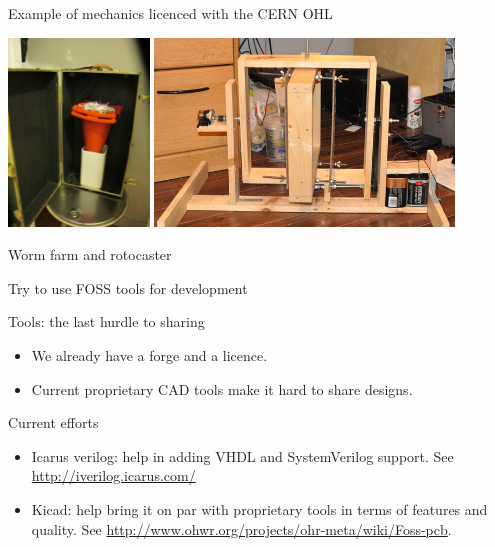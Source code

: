 \documentclass[compress,red]{beamer}
\begin{document}
\begin{frame}{Example of mechanics licenced with the CERN OHL}
 \begin{center}
   \includegraphics[height=5cm]{worm-farm-008.jpg}
   \includegraphics[height=5cm]{rotocaster.jpg}

Worm farm and rotocaster
 \end{center} 
\end{frame}

\begin{frame}{Try to use FOSS tools for development}

\begin{block}{Tools: the last hurdle to sharing}
\begin{itemize}
 \item We already have a forge and a licence.
 \item Current proprietary CAD tools make it hard to share designs.
\end{itemize}
\end{block}

\begin{block}{Current efforts}
\begin{itemize}
 \item Icarus verilog: help in adding VHDL and SystemVerilog support.
 See \href{http://iverilog.icarus.com/}{http://iverilog.icarus.com/}
 \item Kicad: help bring it on par with proprietary tools in terms of
   features and quality. See \href{http://www.ohwr.org/projects/ohr-meta/wiki/Foss-pcb}{http://www.ohwr.org/projects/ohr-meta/wiki/Foss-pcb}.
\end{itemize}
\end{block}

\end{frame}
\end{document}
